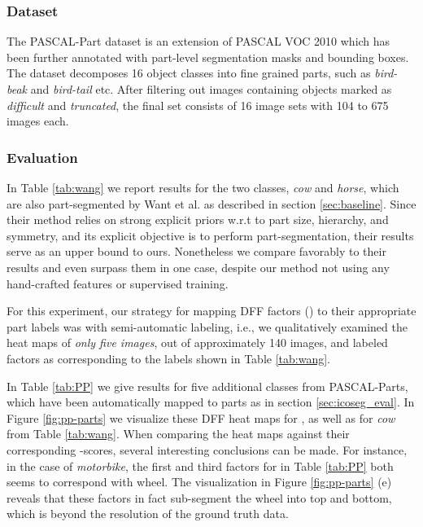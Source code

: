\documentclass[runningheads]{llncs}
\begin{document}
\begin{table}
	\subsubsection{Dataset}
	The PASCAL-Part dataset \cite{Chen2014} is an extension of PASCAL VOC 2010 \cite{pascal-voc-2010} which has been further annotated with part-level segmentation masks and bounding boxes. The dataset decomposes 16 object classes into fine grained parts, such as \emph{bird-beak} and \emph{bird-tail} etc. After filtering out images containing objects marked as \emph{difficult} and \emph{truncated}, the final set consists of 16 image sets with 104 to 675 images each.


	\subsubsection{Evaluation}
	
	In Table \ref{tab:wang} we report results for the two classes, \emph{cow} and \emph{horse}, which are also part-segmented by Want et al. as described in section \ref{sec:baseline}. Since their method relies on strong explicit priors w.r.t to part size, hierarchy, and symmetry, and its explicit objective is to perform part-segmentation, their results serve as an upper bound to ours. Nonetheless we compare favorably to their results and even surpass them in one case, despite our method not using any hand-crafted features or supervised training.
	
	For this experiment, our strategy for mapping DFF factors () to their appropriate part labels was with semi-automatic labeling, i.e., we qualitatively examined the heat maps of \emph{only five images}, out of approximately 140 images, and labeled factors as corresponding to the labels shown in Table \ref{tab:wang}.
	
	In Table \ref{tab:PP} we give  results for five additional classes from PASCAL-Parts, which have been automatically mapped to parts as in section \ref{sec:icoseg_eval}.
	In Figure \ref{fig:pp-parts} we visualize these DFF heat maps for , as well as for \emph{cow} from Table \ref{tab:wang}. When comparing the heat maps against their corresponding -scores, several interesting conclusions can be made. For instance, in the case of \emph{motorbike}, the first and third factors for  in Table \ref{tab:PP} both seems to correspond with wheel. The visualization in Figure \ref{fig:pp-parts} (e) reveals that these factors in fact sub-segment the wheel into top and bottom, which is beyond the resolution of the ground truth data.
	

\end{table}
\end{document}
